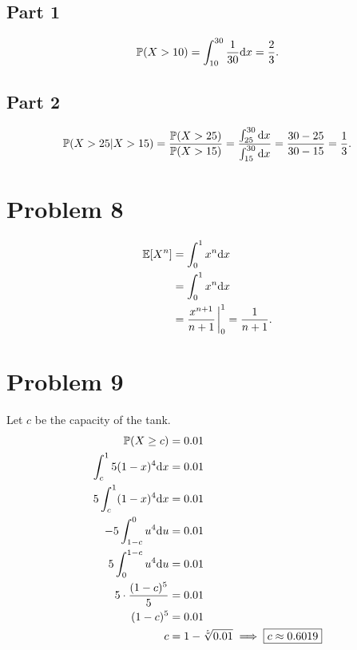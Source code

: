 \documentclass[12pt]{extarticle}
\begin{document}
\subsection*{Part 1}
\begin{align*}
	\mathbb{P}\qty(X > 10) = \int_{10}^{30} \frac{1}{30} \dd x = \frac{2}{3}
.\end{align*}

\subsection*{Part 2}
\begin{align*}
	\mathbb{P}\qty(X > 25 | X > 15) = \frac{\mathbb{P}\qty(X > 25)}{\mathbb{P}\qty(X > 15)} = \frac{\int_{25}^{30} \dd x}{\int_{15}^{30} \dd x} = \frac{30-25}{30-15} = \frac{1}{3}
.\end{align*}

\section*{Problem 8}
\begin{align*}
	\Exp{X^n} &= \int_0^1 x^n \dd x \\
			  &= \int_0^1 x^n \dd x \\
			  &= \frac{x^{n+1}}{n+1} \eval_0^1 = \frac{1}{n+1}
.\end{align*}

\section*{Problem 9}
Let $c$ be the capacity of the tank.
\begin{align*}
	\mathbb{P}\qty(X \geq c) &= 0.01 \\
	\int_c^1 5(1-x)^4 \dd x &= 0.01 \\
	5 \int_c^1 (1-x)^4 \dd x &= 0.01 \\
	-5 \int_{1-c}^0 u^4 \dd u &= 0.01 \\
	5 \int_0^{1-c} u^4 \dd u &= 0.01 \\
	5 \cdot \frac{(1-c)^5}{5} &= 0.01 \\
	(1-c)^5 &= 0.01 \\
	c &= 1 - \sqrt[5]{0.01} \implies \boxed{c \approx 0.6019}
\end{align*}
\end{document}
